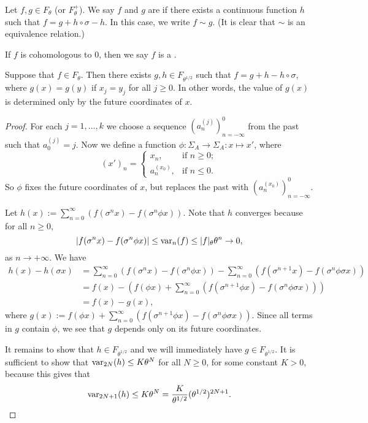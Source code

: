 \begin{definition}
	Let $f, g \in F_\theta$ (or $F_\theta^+$). We say $f$ and $g$ are  if there exists a continuous function $h$ such that $f = g + h \circ \sigma - h$. In this case, we write $f \sim g$. (It is clear that $\sim$ is an equivalence relation.)
	
	If $f$ is cohomologous to $0$, then we say $f$ is a .
\end{definition}

\begin{proposition} \label{prop:pp-1-2}
	Suppose that $f \in F_\theta$. Then there exists $g, h \in F_{\theta^{1 / 2}}$ such that $f = g + h - h \circ \sigma$, where $g(x) = g(y)$ if $x_j = y_j$ for all $j \geq 0$. In other words, the value of $g(x)$ is determined only by the future coordinates of $x$.
	\begin{proof}
		For each $j = 1, \dots, k$ we choose a sequence $(a_n^{(j)})_{n = -\infty}^0$ from the past such that $a_0^{(j)} = j$. Now we define a function $\phi : \Sigma_A \to \Sigma_A : x \mapsto x'$, where
		\[
			(x')_n =
			\begin{cases}
				x_n, & \text{if } n \geq 0; \\
				a_n^{(x_0)}, & \text{if } n \leq 0.
			\end{cases}
		\]
		So $\phi$ fixes the future coordinates of $x$, but replaces the past with $(a_n^{(x_0)})_{n = -\infty}^0$.
		
		Let $h(x) := \sum_{n = 0}^\infty{(f(\sigma^n{x}) - f(\sigma^n \phi{x}))}$. Note that $h$ converges because for all $n \geq 0$,
		\[
			|f(\sigma^n{x}) - f(\sigma^n \phi{x})| \leq \operatorname{var}_n(f) \leq |f|_\theta \theta^n \to 0,
		\]
		as $n \to +\infty$. We have
		\begin{align*}
			h(x) - h(\sigma{x}) &= \sum_{n = 0}^\infty{\left(f(\sigma^n{x}) - f(\sigma^n \phi{x})\right)} - \sum_{n = 0}^\infty{\left(f(\sigma^{n + 1}{x}) - f(\sigma^n \phi \sigma{x})\right)} \\
				&= f(x) - \left(f(\phi{x}) + \sum_{n = 0}^\infty{(f(\sigma^{n + 1} \phi{x}) - f(\sigma^n \phi \sigma{x}))}\right) \\
				&= f(x) - g(x),
		\end{align*}
		where $g(x) := f(\phi{x}) + \sum_{n = 0}^\infty{\left(f(\sigma^{n + 1} \phi{x}) - f(\sigma^n \phi \sigma{x})\right)}$. Since all terms in $g$ contain $\phi$, we see that $g$ depends only on its future coordinates.
		
		It remains to show that $h \in F_{\theta^{1 / 2}}$ and we will immediately have $g \in F_{\theta^{1 / 2}}$. It is sufficient to show that $\operatorname{var}_{2N}(h) \leq K\theta^N$ for all $N \geq 0$, for some constant $K > 0$, because this gives that
		\[
			\operatorname{var}_{2N + 1}(h) \leq K\theta^N = \frac{K}{\theta^{1 / 2}}(\theta^{1 / 2})^{2N + 1}.
		\]
		

\end{proof}
\end{proposition}
